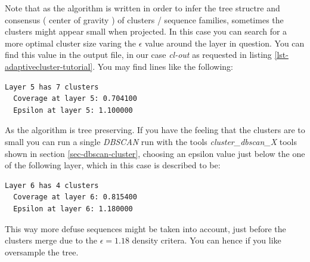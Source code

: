 Note that as the algorithm is written in order to infer the tree
structre and consensus ( center of gravity ) of clusters / sequence
families, sometimes the clusters might appear small when projected. In
this case you can search for a more optimal cluster size varing the
$\epsilon$ value around the layer in question. You can find this value
in the output file, in our case \emph{cl-out} as requested in listing
\ref{lst-adaptivecluster-tutorial}. You may find lines like the
following:
\begin{lstlisting}
Layer 5 has 7 clusters
  Coverage at layer 5: 0.704100
  Epsilon at layer 5: 1.100000
\end{lstlisting}
As the algorithm is tree preserving. If you have the feeling that the
clusters are to small you can run a single \emph{DBSCAN} run
\cite{dbscan} with the tools \emph{cluster\_dbscan\_X} tools
shown in section \ref{sec-dbscan-cluster},
choosing an epsilon value just below the one of the following layer,
which in this case is described to be:
\begin{lstlisting}
Layer 6 has 4 clusters
  Coverage at layer 6: 0.815400
  Epsilon at layer 6: 1.180000
\end{lstlisting}
This way more defuse sequences might be taken into account, just
before the clusters merge due to the $\epsilon=1.18$ density
critera. You can hence if you like oversample the tree.

